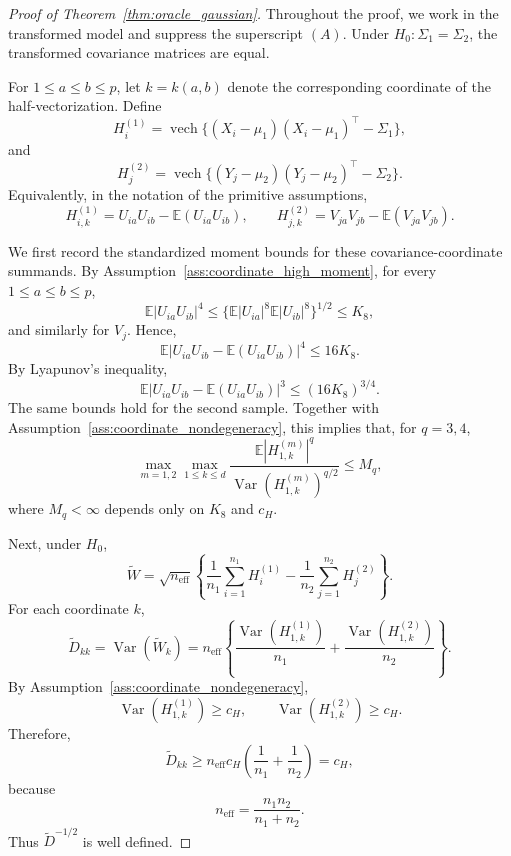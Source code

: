\documentclass[
  12pt]{article}
\theoremstyle{plain}
\theoremstyle{definition}
\theoremstyle{remark}
\begin{document}
\begin{proof}[Proof of Theorem~\ref{thm:oracle_gaussian}]
Throughout the proof, we work in the transformed model and suppress the
superscript \((A)\). Under \(H_0:\Sigma_1=\Sigma_2\), the transformed covariance
matrices are equal.

For \(1\le a\le b\le p\), let \(k=k(a,b)\) denote the corresponding coordinate
of the half-vectorization. Define
\[
H_i^{(1)}
=
\operatorname{vech}
\{(X_i-\mu_1)(X_i-\mu_1)^\top-\Sigma_1\},
\]
and
\[
H_j^{(2)}
=
\operatorname{vech}
\{(Y_j-\mu_2)(Y_j-\mu_2)^\top-\Sigma_2\}.
\]
Equivalently, in the notation of the primitive assumptions,
\[
H_{i,k}^{(1)}
=
U_{ia}U_{ib}-\mathbb E(U_{ia}U_{ib}),
\qquad
H_{j,k}^{(2)}
=
V_{ja}V_{jb}-\mathbb E(V_{ja}V_{jb}).
\]

We first record the standardized moment bounds for these covariance-coordinate
summands. By Assumption~\ref{ass:coordinate_high_moment}, for every
\(1\le a\le b\le p\),
\[
\mathbb E |U_{ia}U_{ib}|^4
\le
\{\mathbb E|U_{ia}|^8\mathbb E|U_{ib}|^8\}^{1/2}
\le K_8,
\]
and similarly for \(V_j\). Hence,
\[
\mathbb E
\left|
U_{ia}U_{ib}-\mathbb E(U_{ia}U_{ib})
\right|^4
\le
16K_8.
\]
By Lyapunov's inequality,
\[
\mathbb E
\left|
U_{ia}U_{ib}-\mathbb E(U_{ia}U_{ib})
\right|^3
\le
(16K_8)^{3/4}.
\]
The same bounds hold for the second sample. Together with
Assumption~\ref{ass:coordinate_nondegeneracy}, this implies that, for
\(q=3,4\),
\[
\max_{m=1,2}
\max_{1\le k\le d}
\frac{
\mathbb E|H_{1,k}^{(m)}|^q
}{
\operatorname{Var}(H_{1,k}^{(m)})^{q/2}
}
\le M_q,
\]
where \(M_q<\infty\) depends only on \(K_8\) and \(c_H\).

Next, under \(H_0\),
\[
\widetilde W
=
\sqrt{n_{\mathrm{eff}}}
\left\{
\frac1{n_1}\sum_{i=1}^{n_1}H_i^{(1)}
-
\frac1{n_2}\sum_{j=1}^{n_2}H_j^{(2)}
\right\}.
\]
For each coordinate \(k\),
\[
\widetilde D_{kk}
=
\operatorname{Var}(\widetilde W_k)
=
n_{\mathrm{eff}}
\left\{
\frac{\operatorname{Var}(H_{1,k}^{(1)})}{n_1}
+
\frac{\operatorname{Var}(H_{1,k}^{(2)})}{n_2}
\right\}.
\]
By Assumption~\ref{ass:coordinate_nondegeneracy},
\[
\operatorname{Var}(H_{1,k}^{(1)})\ge c_H,
\qquad
\operatorname{Var}(H_{1,k}^{(2)})\ge c_H.
\]
Therefore,
\[
\widetilde D_{kk}
\ge
n_{\mathrm{eff}}c_H
\left(
\frac1{n_1}+\frac1{n_2}
\right)
=
c_H,
\]
because
\[
n_{\mathrm{eff}}
=
\frac{n_1n_2}{n_1+n_2}.
\]
Thus \(\widetilde D^{-1/2}\) is well defined.


\end{proof}
\end{document}
